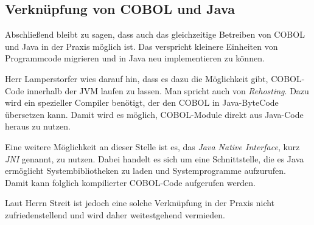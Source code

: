 \subsection*{Verknüpfung von COBOL und Java} \label{cobolandjava}

Abschließend bleibt zu sagen, dass auch das gleichzeitige Betreiben von COBOL und Java in der Praxis möglich ist. Das verspricht kleinere Einheiten von Programmcode migrieren und in Java neu implementieren zu können.

Herr Lamperstorfer wies darauf hin, dass es dazu die Möglichkeit gibt, COBOL-Code innerhalb der JVM laufen zu lassen. Man spricht auch von \textit{Rehosting}. Dazu wird ein spezieller Compiler benötigt, der den COBOL in Java-ByteCode übersetzen kann. Damit wird es möglich, COBOL-Module direkt aus Java-Code heraus zu nutzen.

Eine weitere Möglichkeit an dieser Stelle ist es, das \textit{Java Native Interface}, kurz \textit{JNI} genannt, zu nutzen. Dabei handelt es sich um eine Schnittstelle, die es Java ermöglicht Systembibliotheken zu laden und Systemprogramme aufzurufen. Damit kann folglich kompilierter COBOL-Code aufgerufen werden.

Laut Herrn Streit ist jedoch eine solche Verknüpfung in der Praxis nicht zufriedenstellend und wird daher weitestgehend vermieden.